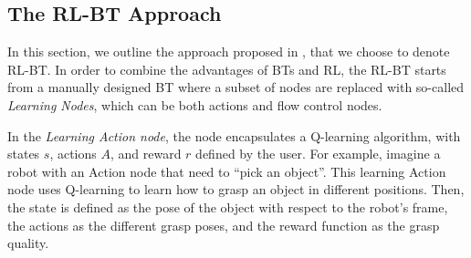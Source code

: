 %

%
%
%
%

%

\subsection{The RL-BT Approach}
In this section, we outline the approach proposed in \cite{pereira2015framework}, that we choose to denote RL-BT. 
In order to combine the advantages of BTs and RL,
 the RL-BT starts from a manually designed BT where a subset of nodes are replaced with so-called \emph{Learning Nodes},
 which can be both actions and flow control nodes.
 
 In the \emph{Learning Action node}, the node encapsulates a Q-learning algorithm,
 with  states $s$, actions $A$, and reward $r$ defined by the user. 
 For example, imagine a robot with an Action node that need to ``pick an object''. This learning Action node uses Q-learning to learn how to grasp an object in different positions. Then, the state is defined as the pose of the object with respect to the robot's frame, the actions as the different grasp poses, and the reward function as the grasp quality.
 
